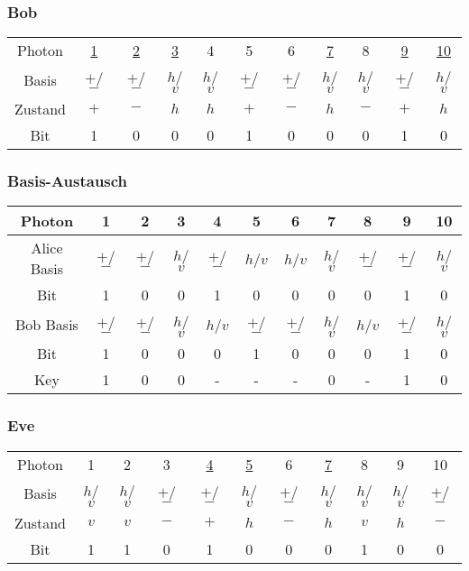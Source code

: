 \begin{frame}
	\frametitle{Bob}
	\small
	\begin{tabular}{c|c|c|c|c|c|c|c|c|c|c}
		Photon & \underline{1} & \underline{2} & \underline{3} & 4 & 5 & 6 & \underline{7} & 8 & \underline{9} &  \underline{10} \\
		Basis & $+$/$-$ & $+$/$-$ & $h$/$v$ & $h$/$v$ & $+$/$-$ & $+$/$-$ & $h$/$v$ & $h$/$v$ & $+$/$-$ & $h$/$v$ \\
		Zustand & $+$ & $-$ & $h$ & $h$ & $+$ & $-$ & $h$ & $-$ & $+$ & $h$\\
		Bit & 1 & 0 & 0 & 0 & 1 & 0 & 0 & 0 & 1 & 0 \\
	\end{tabular}
\end{frame}

\begin{frame}
	\frametitle{Basis-Austausch}
	\small
	\begin{tabular}{c|c|c|c|c|c|c|c|c|c|c}
		Photon & 1 & 2 & 3 & 4 & 5 & 6 & 7 & 8 & 9 & 10  \\
		\hline
		Alice Basis & \tiny $+$/$-$ & \tiny $+$/$-$ & \tiny $h$/$v$ & \tiny $+$/$-$ & \tiny $h$/$v$ & \tiny $h$/$v$ & \tiny $h$/$v$ & \tiny $+$/$-$ & \tiny $+$/$-$ & \tiny $h$/$v$ \\
		Bit & 1 & 0 & 0 & 1 & 0 & 0 & 0 & 0 & 1 & 0 \\
		\hline
		Bob Basis & \tiny $+$/$-$ & \tiny $+$/$-$ & \tiny $h$/$v$ & \tiny $h$/$v$ & \tiny $+$/$-$ & \tiny $+$/$-$ & \tiny $h$/$v$ & \tiny $h$/$v$ & \tiny $+$/$-$ & \tiny $h$/$v$ \\
		Bit & 1 & 0 & 0 & 0 & 1 & 0 & 0 & 0 & 1 & 0 \\
		\hline
		Key & 1 & 0 & 0 & - & - & - & 0 & - & 1 & 0 \\
	\end{tabular}
\end{frame}

\begin{frame}
	\frametitle{Eve}
	\small
	\begin{tabular}{c|c|c|c|c|c|c|c|c|c|c}
		Photon & 1 & 2 & 3 & \underline{4} & \underline{5} & 6 & \underline{7} & 8 & 9 & 10 \\
		Basis & $h$/$v$ & $h$/$v$ & $+$/$-$ & $+$/$-$ & $h$/$v$ & $+$/$-$ & $h$/$v$ & $h$/$v$ & $h$/$v$ & $+$/$-$ \\
		Zustand & $v$ & $v$ & $-$ & $+$ & $h$ & $-$ & $h$ & $v$ & $h$ & $-$\\
		Bit & 1 & 1 & 0 & 1 & 0 & 0 & 0 & 1 & 0 & 0 \\
	\end{tabular}
\end{frame}

